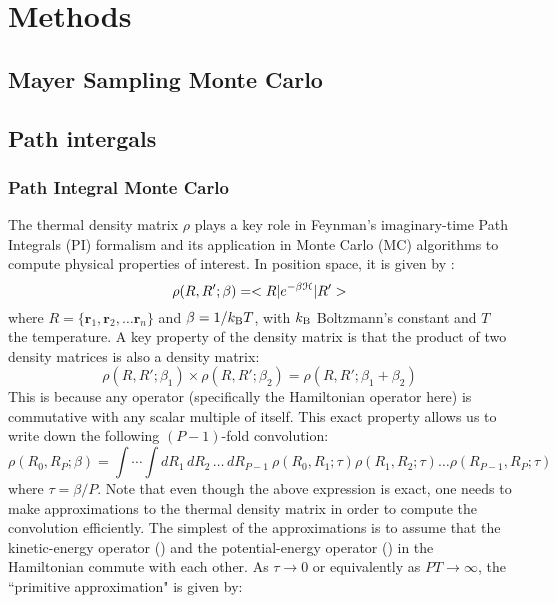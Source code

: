 \chapter{Methods}\label{chap:methods}
\khExplicitPfalse
\graphicspath{{/home/ram/Desktop/Acads/Phd/dissertation/psuThesis/Chapter-2/Figures/}}
\section{Mayer Sampling Monte Carlo}
\section{Path intergals}
    
    \subsection{Path Integral Monte Carlo}
        The thermal density matrix $\rho$ plays a key role in Feynman's imaginary-time Path Integrals (PI) formalism and its application in Monte Carlo (MC) algorithms to compute physical properties of interest. In position space, it is given by \cite{Feynman,Ceperley1995,Cui1997}:
        \begin{equation}\label{eq:rho}
            \rho (R , R' ; \beta) = < R | e^{- \beta \text{$\mathcal{H}$} } | R' >
        \end{equation}
        where $R = \{\bm{r}_1, \bm{r}_2, \ldots \bm{r}_n\}$ and $\beta = 1/k_{\rm B}T$, with $k_{\rm B}$ Boltzmann's constant and $T$ the temperature. A key property of the density matrix is that the product of two density matrices is also a density matrix:
        \begin{equation}\label{eq:dmProduct}
            \rho (R, R'; \beta_1) \times \rho (R, R'; \beta_2) = \rho (R, R'; \beta_1 + \beta_2)
        \end{equation}
        This is because any operator (specifically the Hamiltonian operator  here) is commutative with any scalar multiple of itself. This exact property allows us to write down the following $(P-1)$-fold convolution:
        \begin{equation}\label{eq:convolution}
            \rho (R_0, R_P; \beta) = \displaystyle\int \cdots \int dR_1 \, dR_2 \, \ldots \, dR_{P-1} \: \rho (R_0, R_1; \tau) \rho (R_1, R_2; \tau) \ldots \rho (R_{P-1}, R_P; \tau)
        \end{equation}
        where $\tau = \beta/P$. Note that even though the above expression is exact, one needs to make approximations to the thermal density matrix in order to compute the convolution efficiently. The simplest of the approximations is to assume that the kinetic-energy operator () and the potential-energy operator () in the Hamiltonian commute with each other. As $\tau \to 0$ or equivalently as $PT \to \infty$, the ``primitive approximation" is given by:
